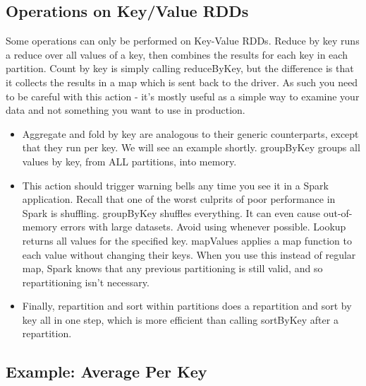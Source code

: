 \documentclass[a4paper,12pt]{article}
\begin{document}
\subsection*{Operations on Key/Value RDDs}
Some operations can only be performed on Key-Value RDDs.
Reduce by key runs a reduce over all values of a key, then combines the results for each key in each
partition.
Count by key is simply calling reduceByKey, but the difference is that it collects the results in a map
which is sent back to the driver. As such you need to be careful with this action - it's mostly useful as a
simple way to examine your data and not something you want to use in production.
\begin{itemize}
\item Aggregate and fold by key are analogous to their generic counterparts, except that they run per key. We
will see an example shortly.
groupByKey groups all values by key, from ALL partitions, into memory. \item This action should trigger
warning bells any time you see it in a Spark application. Recall that one of the worst culprits of poor
performance in Spark is shuffling. groupByKey shuffles everything. It can even cause out-of-memory
errors with large datasets. Avoid using whenever possible.
Lookup returns all values for the specified key.
mapValues applies a map function to each value without changing their keys. When you use this instead
of regular map, Spark knows that any previous partitioning is still valid, and so repartitioning isn’t
necessary.
\item Finally, repartition and sort within partitions does a repartition and sort by key all in one step, which is
more efficient than calling sortByKey after a repartition.
\end{itemize}
\subsection*{Example: Average Per Key}
\end{document}
